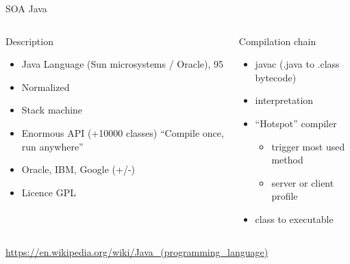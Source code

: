 %
\begin{Frame}{SOA Java}
  \begin{columns}[t]
    \begin{column}{5cm} %
      \begin{block}{Description}
        \begin{itemize}
        \item Java Language (Sun microsystems / Oracle), 95
        \item Normalized
        \item Stack machine
        \item Enormous API (+10000 classes) ``Compile once, run anywhere''
        \item Oracle, IBM, Google (+/-)
        \item Licence GPL
        \end{itemize}
      \end{block} 
    \end{column}
    
    \begin{column}{5cm} %
      \begin{block}{Compilation chain}
        \begin{itemize}
        \item javac (.java to .class bytecode)
        \item interpretation
        \item ``Hotspot'' compiler\TBD
          \begin{itemize}
          \item trigger most used method
          \item server or client profile
          \end{itemize}
        \item class to executable
        \end{itemize}
      \end{block}   
    \end{column}
  \end{columns}  
\url{https://en.wikipedia.org/wiki/Java_(programming_language)}
\end{Frame}


